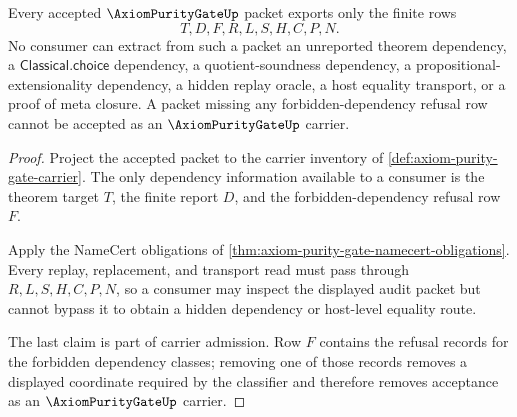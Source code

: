 \begin{theorem}
\label{thm:axiom-purity-gate-nonescape}
Every accepted $\AxiomPurityGateUp$ packet exports only the finite rows
$$
T,D,F,R,L,S,H,C,P,N.
$$
No consumer can extract from such a packet an unreported theorem dependency, a $\mathsf{Classical.choice}$ dependency, a quotient-soundness dependency, a propositional-extensionality dependency, a hidden replay oracle, a host equality transport, or a proof of meta closure. A packet missing any forbidden-dependency refusal row cannot be accepted as an $\AxiomPurityGateUp$ carrier.
\end{theorem}
\begin{proof}
Project the accepted packet to the carrier inventory of \autoref{def:axiom-purity-gate-carrier}. The only dependency information available to a consumer is the theorem target $T$, the finite report $D$, and the forbidden-dependency refusal row $F$.

Apply the NameCert obligations of \autoref{thm:axiom-purity-gate-namecert-obligations}. Every replay, replacement, and transport read must pass through $R,L,S,H,C,P,N$, so a consumer may inspect the displayed audit packet but cannot bypass it to obtain a hidden dependency or host-level equality route.

The last claim is part of carrier admission. Row $F$ contains the refusal records for the forbidden dependency classes; removing one of those records removes a displayed coordinate required by the classifier and therefore removes acceptance as an $\AxiomPurityGateUp$ carrier.
\end{proof}

